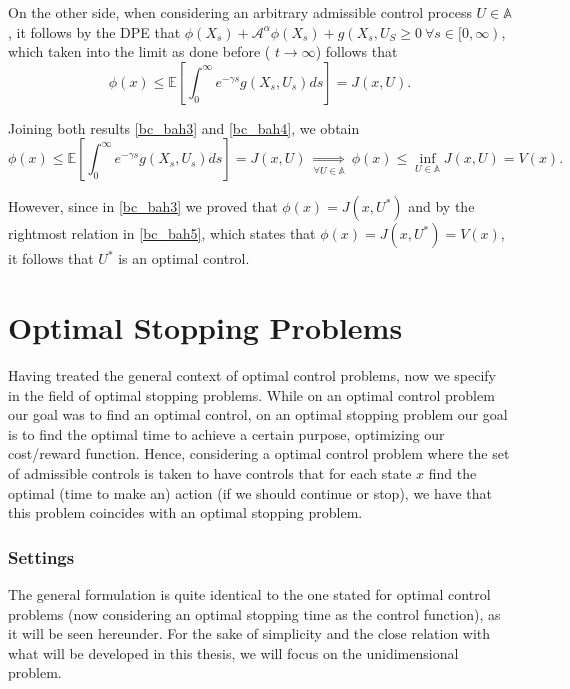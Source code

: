 On the other side, when considering an arbitrary admissible control process $U \in \mathds{A}$, it follows by the DPE that $\phi(X_s)+\mathcal{A}^\alpha \phi(X_s)+g(X_s,U_S \geq 0 \ \forall s \in [0, \infty)$, which taken into the limit as done before ( $t \rightarrow \infty$) follows that
\begin{equation}
\phi(x) \leq \mathds{E} \left[ \int^\infty_0 e^{-\gamma s}g(X_s,U_s)ds \right]=J(x,U).
\label{bc_bah4}
\end{equation}

Joining both results \eqref{bc_bah3} and \eqref{bc_bah4}, we obtain
\begin{equation}
\phi(x) \leq \mathds{E} \left[ \int^\infty_0 e^{-\gamma s}g(X_s,U_s)ds \right]=J(x,U) \ \underset{\forall U \in \mathds{A}}{\Rightarrow} \ \phi(x) \leq \inf_{U \in \mathds{A}} J(x,U)=V(x).
\label{bc_bah5}
\end{equation}

However, since in \eqref{bc_bah3} we proved that $\phi(x)=J(x,U^*)$ and by the rightmost relation in \eqref{bc_bah5}, which states that $\phi(x)=J(x,U^*)=V(x)$, it follows that $U^*$ is an optimal control.


\section{Optimal Stopping Problems}

Having treated the general context of optimal control problems, now we specify in the field of optimal stopping problems. While on an optimal control problem our goal was to find an optimal control, on an optimal stopping problem our goal is to find the optimal time to achieve a certain purpose, optimizing our cost/reward function. Hence, considering a optimal control problem where the set of admissible controls is taken to have controls that for each state $x$ find the optimal (time to make an) action (if we should continue or stop), we have that this problem coincides with an optimal stopping problem.


\subsubsection{Settings}
 The general formulation is quite identical to the one stated for optimal control problems (now considering an optimal stopping time as the control function), as it will be seen hereunder. 
 For the sake of simplicity and the close relation with what will be developed in this thesis, we will focus on the unidimensional problem.
 
